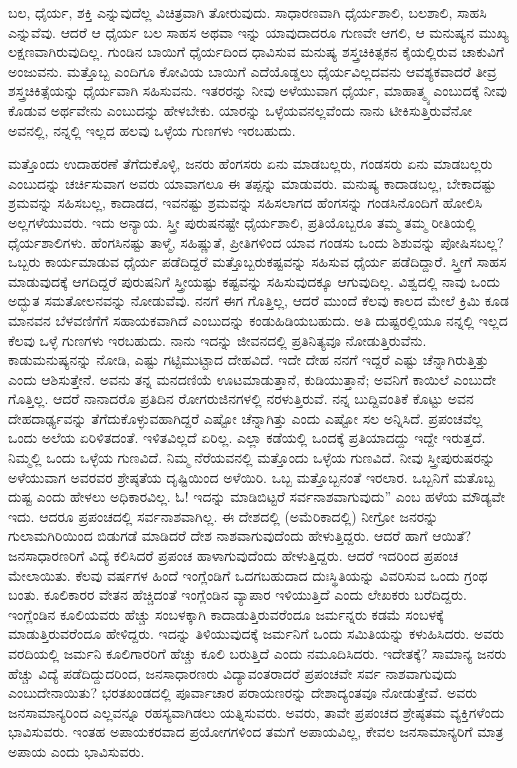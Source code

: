 ಬಲ, ಧೈರ್ಯ, ಶಕ್ತಿ ಎನ್ನುವುದೆಲ್ಲ ವಿಚಿತ್ರವಾಗಿ ತೋರುವುದು. ಸಾಧಾರಣವಾಗಿ ಧೈರ್ಯಶಾಲಿ, ಬಲಶಾಲಿ, ಸಾಹಸಿ ಎನ್ನುವೆವು. ಆದರೆ ಆ ಧೈರ್ಯ ಬಲ ಸಾಹಸ ಅಥವಾ ಇನ್ನು ಯಾವುದಾದರೂ ಗುಣವೇ ಆಗಲಿ, ಆ ಮನುಷ್ಯನ ಮುಖ್ಯ ಲಕ್ಷಣವಾಗಿರುವುದಿಲ್ಲ. ಗುಂಡಿನ ಬಾಯಿಗೆ ಧೈರ್ಯದಿಂದ ಧಾವಿಸುವ ಮನುಷ್ಯ ಶಸ್ತ್ರಚಿಕಿತ್ಸಕನ ಕೈಯಲ್ಲಿರುವ ಚಾಕುವಿಗೆ ಅಂಜುವನು. ಮತ್ತೊಬ್ಬ ಎಂದಿಗೂ ಕೋವಿಯ ಬಾಯಿಗೆ ಎದೆಯೊಡ್ಡಲು ಧೈರ್ಯವಿಲ್ಲದವನು ಆವಶ್ಯಕವಾದರೆ ತೀವ್ರ ಶಸ್ತ್ರಚಿಕಿತ್ಸೆಯನ್ನು ಧೈರ್ಯವಾಗಿ ಸಹಿಸುವನು. ಇತರರನ್ನು ನೀವು ಅಳೆಯುವಾಗ ಧೈರ್ಯ, ಮಾಹಾತ್ಮ್ಯ ಎಂಬುದಕ್ಕೆ ನೀವು ಕೊಡುವ ಅರ್ಥವೇನು ಎಂಬುದನ್ನು ಹೇಳಬೇಕು. ಯಾರನ್ನು ಒಳ್ಳೆಯವನಲ್ಲವೆಂದು ನಾನು ಟೀಕಿಸುತ್ತಿರುವೆನೋ ಅವನಲ್ಲಿ, ನನ್ನಲ್ಲಿ ಇಲ್ಲದ ಹಲವು ಒಳ್ಳೆಯ ಗುಣಗಳು ಇರಬಹುದು.

ಮತ್ತೊಂದು ಉದಾಹರಣೆ ತೆಗೆದುಕೊಳ್ಳಿ, ಜನರು ಹೆಂಗಸರು ಏನು ಮಾಡಬಲ್ಲರು, ಗಂಡಸರು ಏನು ಮಾಡಬಲ್ಲರು ಎಂಬುದನ್ನು ಚರ್ಚಿಸುವಾಗ ಅವರು ಯಾವಾಗಲೂ ಈ ತಪ್ಪನ್ನು ಮಾಡುವರು. ಮನುಷ್ಯ ಕಾದಾಡಬಲ್ಲ, ಬೇಕಾದಷ್ಟು ಶ್ರಮವನ್ನು ಸಹಿಸಬಲ್ಲ, ಕಾದಾಡದ, ಇವನಷ್ಟು ಶ್ರಮವನ್ನು ಸಹಿಸಲಾಗದ ಹೆಂಗಸನ್ನು ಗಂಡಸಿನೊಂದಿಗೆ ಹೋಲಿಸಿ ಅಲ್ಲಗಳೆಯುವರು. ಇದು ಅನ್ಯಾಯ. ಸ್ತ್ರೀ ಪುರುಷನಷ್ಟೇ ಧೈರ್ಯಶಾಲಿ, ಪ್ರತಿಯೊಬ್ಬರೂ ತಮ್ಮ ತಮ್ಮ ರೀತಿಯಲ್ಲಿ ಧೈರ್ಯಶಾಲಿಗಳು. ಹೆಂಗಸಿನಷ್ಟು ತಾಳ್ಮೆ, ಸಹಿಷ್ಣುತೆ, ಪ್ರೀತಿಗಳಿಂದ ಯಾವ ಗಂಡಸು ಒಂದು ಶಿಶುವನ್ನು ಪೋಷಿಸಬಲ್ಲ? ಒಬ್ಬರು ಕಾರ್ಯಮಾಡುವ ಧೈರ್ಯ ಪಡೆದಿದ್ದರೆ ಮತ್ತೊಬ್ಬರು\break ಕಷ್ಟವನ್ನು ಸಹಿಸುವ ಧೈರ್ಯ ಪಡೆದಿದ್ದಾರೆ. ಸ್ತ್ರೀಗೆ ಸಾಹಸ ಮಾಡುವುದಕ್ಕೆ ಆಗದಿದ್ದರೆ ಪುರುಷನಿಗೆ ಸ್ತ್ರೀಯಷ್ಟು ಕಷ್ಟವನ್ನು ಸಹಿಸುವುದಕ್ಕೂ ಆಗುವುದಿಲ್ಲ. ವಿಶ್ವದಲ್ಲಿ ನಾವು ಒಂದು ಅದ್ಭುತ ಸಮತೋಲನವನ್ನು ನೋಡುವೆವು. ನನಗೆ ಈಗ ಗೊತ್ತಿಲ್ಲ, ಆದರೆ ಮುಂದೆ ಕೆಲವು ಕಾಲದ ಮೇಲೆ ಕ್ರಿಮಿ ಕೂಡ ಮಾನವನ ಬೆಳವಣಿಗೆಗೆ ಸಹಾಯಕವಾಗಿದೆ ಎಂಬುದನ್ನು ಕಂಡುಹಿಡಿಯಬಹುದು. ಅತಿ ದುಷ್ಟರಲ್ಲಿಯೂ ನನ್ನಲ್ಲಿ ಇಲ್ಲದ ಕೆಲವು ಒಳ್ಳೆ ಗುಣಗಳು ಇರಬಹುದು. ನಾನು ಇದನ್ನು ಜೀವನದಲ್ಲಿ ಪ್ರತಿನಿತ್ಯವೂ ನೋಡುತ್ತಿರುವೆನು. ಕಾಡುಮನುಷ್ಯನನ್ನು ನೋಡಿ, ಎಷ್ಟು ಗಟ್ಟಿಮುಟ್ಟಾದ ದೇಹವಿದೆ. ಇದೇ ದೇಹ ನನಗೆ ಇದ್ದರೆ ಎಷ್ಟು ಚೆನ್ನಾಗಿರುತ್ತಿತ್ತು ಎಂದು ಆಶಿಸುತ್ತೇನೆ. ಅವನು ತನ್ನ ಮನದಣಿಯೆ ಊಟಮಾಡುತ್ತಾನೆ, ಕುಡಿಯುತ್ತಾನೆ; ಅವನಿಗೆ ಕಾಯಿಲೆ ಎಂಬುದೇ ಗೊತ್ತಿಲ್ಲ. ಆದರೆ ನಾನಾದರೊ ಪ್ರತಿದಿನ ರೋಗರುಜಿನಗಳಲ್ಲಿ ನರಳುತ್ತಿರುವೆ. ನನ್ನ ಬುದ್ದಿವಂತಿಕೆ ಕೊಟ್ಟು ಅವನ ದೇಹದಾರ್ಢ್ಯವನ್ನು ತೆಗೆದುಕೊಳ್ಳುವಹಾಗಿದ್ದರೆ ಎಷ್ಟೋ ಚೆನ್ನಾಗಿತ್ತು ಎಂದು ಎಷ್ಟೋ ಸಲ ಅನ್ನಿಸಿದೆ. ಪ್ರಪಂಚವೆಲ್ಲ ಒಂದು ಅಲೆಯ ಏರಿಳಿತದಂತೆ. ಇಳಿತವಿಲ್ಲದೆ ಏರಿಲ್ಲ. ಎಲ್ಲಾ ಕಡೆಯಲ್ಲಿ ಒಂದಕ್ಕೆ ಪ್ರತಿಯಾದದ್ದು ಇದ್ದೇ ಇರುತ್ತದೆ. ನಿಮ್ಮಲ್ಲಿ ಒಂದು ಒಳ್ಳೆಯ ಗುಣವಿದೆ. ನಿಮ್ಮ ನೆರೆಯವನಲ್ಲಿ ಮತ್ತೊಂದು ಒಳ್ಳೆಯ ಗುಣವಿದೆ. ನೀವು ಸ್ತ್ರೀಪುರುಷರನ್ನು ಅಳೆಯುವಾಗ ಅವರವರ ಶ್ರೇಷ್ಠತೆಯ ದೃಷ್ಟಿಯಿಂದ ಅಳೆಯಿರಿ. ಒಬ್ಬ ಮತ್ತೊಬ್ಬನಂತೆ ಇರಲಾರ. ಒಬ್ಬನಿಗೆ ಮತೊಬ್ಬ ದುಷ್ಟ ಎಂದು ಹೇಳಲು ಅಧಿಕಾರವಿಲ್ಲ. ಓ! ಇದನ್ನು ಮಾಡಿಬಿಟ್ಟರೆ ಸರ್ವನಾಶವಾಗುವುದು'' ಎಂಬ ಹಳೆಯ ಮೌಡ್ಯವೇ ಇದು. ಆದರೂ ಪ್ರಪಂಚದಲ್ಲಿ ಸರ್ವನಾಶವಾಗಿಲ್ಲ. ಈ ದೇಶದಲ್ಲಿ (ಅಮೆರಿಕಾದಲ್ಲಿ) ನೀಗ್ರೋ ಜನರನ್ನು ಗುಲಾಮಗಿರಿಯಿಂದ ಬಿಡುಗಡೆ ಮಾಡಿದರೆ ದೇಶ ನಾಶವಾಗುವುದೆಂದು ಹೇಳುತ್ತಿದ್ದರು. ಆದರೆ ಹಾಗೆ ಆಯಿತೆ? ಜನಸಾಧಾರಣರಿಗೆ ವಿದ್ಯೆ ಕಲಿಸಿದರೆ ಪ್ರಪಂಚ ಹಾಳಾಗುವುದೆಂದು ಹೇಳುತ್ತಿದ್ದರು. ಆದರೆ ಇದರಿಂದ ಪ್ರಪಂಚ ಮೇಲಾಯಿತು. ಕೆಲವು ವರ್ಷಗಳ ಹಿಂದೆ ಇಂಗ್ಲೆಂಡಿಗೆ ಒದಗಬಹುದಾದ ದುಃಸ್ಥಿತಿಯನ್ನು ವಿವರಿಸುವ ಒಂದು ಗ್ರಂಥ ಬಂತು. ಕೂಲಿಕಾರರ ವೇತನ ಹೆಚ್ಚಿದಂತೆ ಇಂಗ್ಲೆಂಡಿನ ವ್ಯಾಪಾರ ಇಳಿಯುತ್ತಿದೆ ಎಂದು ಲೇಖಕರು ಬರೆದಿದ್ದರು. ಇಂಗ್ಲೆಂಡಿನ ಕೂಲಿಯವರು ಹೆಚ್ಚು ಸಂಬಳಕ್ಕಾಗಿ ಕಾದಾಡುತ್ತಿರುವರೆಂದೂ ಜರ್ಮನ್ನರು ಕಡಮೆ ಸಂಬಳಕ್ಕೆ ಮಾಡುತ್ತಿರುವರೆಂದೂ ಹೇಳಿದ್ದರು. ಇದನ್ನು ತಿಳಿಯುವುದಕ್ಕೆ ಜರ್ಮನಿಗೆ ಒಂದು ಸಮಿತಿಯನ್ನು ಕಳುಹಿಸಿದರು. ಅವರು ವರದಿಯಲ್ಲಿ ಜರ್ಮನಿ ಕೂಲಿಗಾರರಿಗೆ ಹೆಚ್ಚು ಕೂಲಿ ಬರುತ್ತಿದೆ ಎಂದು ನಮೂದಿಸಿದರು. ಇದೇತಕ್ಕೆ? ಸಾಮಾನ್ಯ ಜನರು ಹೆಚ್ಚು ವಿದ್ಯೆ ಪಡೆದಿದ್ದುದರಿಂದ, ಜನಸಾಧಾರಣರು ವಿದ್ಯಾವಂತರಾದರೆ ಪ್ರಪಂಚವೇ ಸರ್ವ ನಾಶವಾಗುವುದು ಎಂಬುದೇನಾಯಿತು? ಭರತಖಂಡದಲ್ಲಿ ಪೂರ್ವಾಚಾರ ಪರಾಯಣರನ್ನು ದೇಶಾದ್ಯಂತವೂ ನೋಡುತ್ತೇವೆ. ಅವರು ಜನಸಾಮಾನ್ಯರಿಂದ ಎಲ್ಲವನ್ನೂ ರಹಸ್ಯವಾಗಿಡಲು ಯತ್ನಿಸುವರು. ಅವರು, ತಾವೇ ಪ್ರಪಂಚದ ಶ್ರೇಷ್ಠತಮ ವ್ಯಕ್ತಿಗಳೆಂದು ಭಾವಿಸುವರು. ಇಂತಹ ಅಪಾಯಕರವಾದ ಪ್ರಯೋಗಗಳಿಂದ ತಮಗೆ ಅಪಾಯವಿಲ್ಲ, ಕೇವಲ ಜನಸಾಮಾನ್ಯರಿಗೆ ಮಾತ್ರ ಅಪಾಯ ಎಂದು ಭಾವಿಸುವರು.

